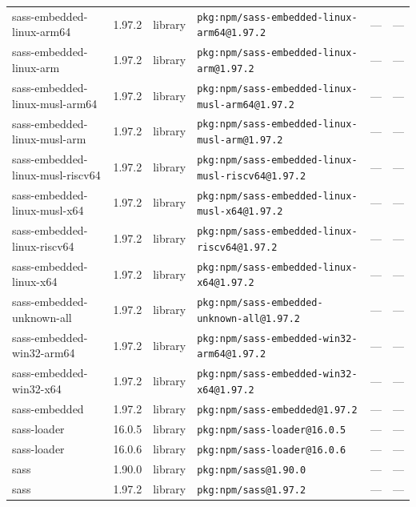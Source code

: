 \documentclass[11pt,a4paper]{article}
\begin{document}
\begin{longtable}{|p{4cm}|p{2cm}|p{1.6cm}|p{5cm}|p{1.5cm}|p{3.5cm}|}
\raggedright sass-embedded-linux-arm64 & 1.97.2 & library & \small\texttt{pkg:npm/sass-embedded-linux-arm64@1.97.2} & — & \small — \\
\raggedright sass-embedded-linux-arm & 1.97.2 & library & \small\texttt{pkg:npm/sass-embedded-linux-arm@1.97.2} & — & \small — \\
\raggedright sass-embedded-linux-musl-arm64 & 1.97.2 & library & \small\texttt{pkg:npm/sass-embedded-linux-musl-arm64@1.97.2} & — & \small — \\
\raggedright sass-embedded-linux-musl-arm & 1.97.2 & library & \small\texttt{pkg:npm/sass-embedded-linux-musl-arm@1.97.2} & — & \small — \\
\raggedright sass-embedded-linux-musl-riscv64 & 1.97.2 & library & \small\texttt{pkg:npm/sass-embedded-linux-musl-riscv64@1.97.2} & — & \small — \\
\raggedright sass-embedded-linux-musl-x64 & 1.97.2 & library & \small\texttt{pkg:npm/sass-embedded-linux-musl-x64@1.97.2} & — & \small — \\
\raggedright sass-embedded-linux-riscv64 & 1.97.2 & library & \small\texttt{pkg:npm/sass-embedded-linux-riscv64@1.97.2} & — & \small — \\
\raggedright sass-embedded-linux-x64 & 1.97.2 & library & \small\texttt{pkg:npm/sass-embedded-linux-x64@1.97.2} & — & \small — \\
\raggedright sass-embedded-unknown-all & 1.97.2 & library & \small\texttt{pkg:npm/sass-embedded-unknown-all@1.97.2} & — & \small — \\
\raggedright sass-embedded-win32-arm64 & 1.97.2 & library & \small\texttt{pkg:npm/sass-embedded-win32-arm64@1.97.2} & — & \small — \\
\raggedright sass-embedded-win32-x64 & 1.97.2 & library & \small\texttt{pkg:npm/sass-embedded-win32-x64@1.97.2} & — & \small — \\
\raggedright sass-embedded & 1.97.2 & library & \small\texttt{pkg:npm/sass-embedded@1.97.2} & — & \small — \\
\raggedright sass-loader & 16.0.5 & library & \small\texttt{pkg:npm/sass-loader@16.0.5} & — & \small — \\
\raggedright sass-loader & 16.0.6 & library & \small\texttt{pkg:npm/sass-loader@16.0.6} & — & \small — \\
\raggedright sass & 1.90.0 & library & \small\texttt{pkg:npm/sass@1.90.0} & — & \small — \\
\raggedright sass & 1.97.2 & library & \small\texttt{pkg:npm/sass@1.97.2} & — & \small — \\

\end{longtable}
\end{document}
